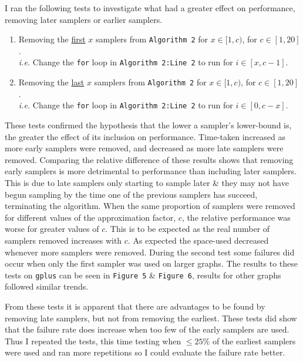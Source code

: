 \documentclass[11pt,twoside,a4paper]{report}
\begin{document}
\par I ran the following tests to investigate what had a greater effect on performance, removing later samplers or earlier samplers.
\begin{enumerate}
	\item Removing the \underline{first} $x$ samplers from \texttt{Algorithm 2} for $x\in[1,c)$, for $c\in[1,20]$.\\
	\textit{i.e.} Change the \texttt{for} loop in \texttt{Algorithm 2:Line 2} to run for $i\in[x,c-1]$.
	\item Removing the \underline{last} $x$ samplers from \texttt{Algorithm 2} for $x\in[1,c)$, for $c\in[1,20]$.\\
	\textit{i.e.} Change the \texttt{for} loop in \texttt{Algorithm 2:Line 2} to run for $i\in[0,c-x]$.
\end{enumerate}

\par These tests confirmed the hypothesis that the lower a sampler's lower-bound is, the greater the effect of its inclusion on performance. Time-taken increased as more early samplers were removed, and decreased as more late samplers were removed. Comparing the relative difference of these results shows that removing early samplers is more detrimental to performance than including later samplers. This is due to late samplers only starting to sample later \& they may not have begun sampling by the time one of the previous samplers has succeed, terminating the algorithm. When the same proportion of samplers were removed for different values of the approximation factor, $c$, the relative performance was worse for greater values of $c$. This is to be expected as the real number of samplers removed increases with $c$. As expected the space-used decreased whenever more samplers were removed. During the second test some failures did occur when only the first sampler was used on larger graphs.
The results to these tests on \texttt{gplus} can be seen in \texttt{Figure 5} \& \texttt{Figure 6}, results for other graphs followed similar trends.

\par From these tests it is apparent that there are advantages to be found by removing late samplers, but not from removing the earliest. These tests did show that the failure rate does increase when too few of the early samplers are used. Thus I repeated the tests, this time testing when $\leq25\%$ of the earliest samplers were used and ran more repetitions so I could evaluate the failure rate better.
\end{document}
